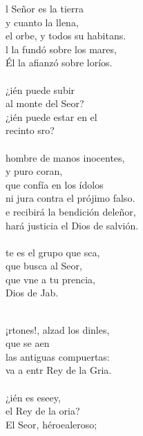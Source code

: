 \begin{cancion}%
	l Señor es la tierra\\
y cuanto la llena,\\
	el orbe, y todos su habitans.\\
	l la fundó sobre los mares,\\
	Él la afianzó sobre loríos.\\
\jump\\
	¿ién puede subir \\
	al monte del Seor?\\
	¿ién puede estar en el \\
	recinto sro?\\
\jump\\
	 hombre de manos inocentes,\\
	y puro coran, \\
	que  confía en los ídolos\\
	ni jura contra el prójimo  falso.\\
	e recibirá la bendición deleñor,\\
	 hará justicia el Dios de salvión.\\
\jump\\
	te es el grupo que sca,\\
	que busca al Seor,\\
	que vne a tu prencia,\\
	Dios de Jab.\\\jump\\
	\begin{chorus}%
	¡rtones!, alzad los dinles, \\
	que se aen\\
las antiguas compuertas:\\
	va a entr  Rey de la Gria.\\
\jump\\
	¿ién es eseey, \\
	el Rey de la oria?\\
	El Seor, héroealeroso;\\

\end{chorus}
\end{cancion}
